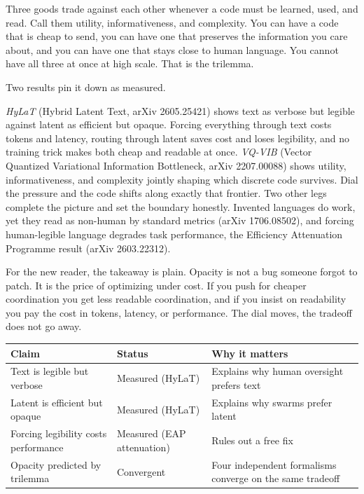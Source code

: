Three goods trade against each other whenever a code must be learned, used, and read. Call them utility, informativeness, and complexity. You can have a code that is cheap to send, you can have one that preserves the information you care about, and you can have one that stays close to human language. You cannot have all three at once at high scale. That is the trilemma.

Two results pin it down as measured.

\textit{HyLaT} (Hybrid Latent Text, arXiv 2605.25421) shows text as verbose but legible against latent as efficient but opaque. Forcing everything through text costs tokens and latency, routing through latent saves cost and loses legibility, and no training trick makes both cheap and readable at once. \textit{VQ-VIB} (Vector Quantized Variational Information Bottleneck, arXiv 2207.00088) shows utility, informativeness, and complexity jointly shaping which discrete code survives. Dial the pressure and the code shifts along exactly that frontier. Two other legs complete the picture and set the boundary honestly. Invented languages do work, yet they read as non-human by standard metrics (arXiv 1706.08502), and forcing human-legible language degrades task performance, the Efficiency Attenuation Programme result (arXiv 2603.22312).

For the new reader, the takeaway is plain. Opacity is not a bug someone forgot to patch. It is the price of optimizing under cost. If you push for cheaper coordination you get less readable coordination, and if you insist on readability you pay the cost in tokens, latency, or performance. The dial moves, the tradeoff does not go away.

\begin{center}
\small
\begin{tabular}{p{3.0cm}p{3.6cm}p{5.8cm}}
\toprule
Claim & Status & Why it matters \\
\midrule
Text is legible but verbose & Measured (HyLaT) & Explains why human oversight prefers text \\
Latent is efficient but opaque & Measured (HyLaT) & Explains why swarms prefer latent \\
Forcing legibility costs performance & Measured (EAP attenuation) & Rules out a free fix \\
Opacity predicted by trilemma & Convergent & Four independent formalisms converge on the same tradeoff \\
\bottomrule
\end{tabular}
\end{center}

